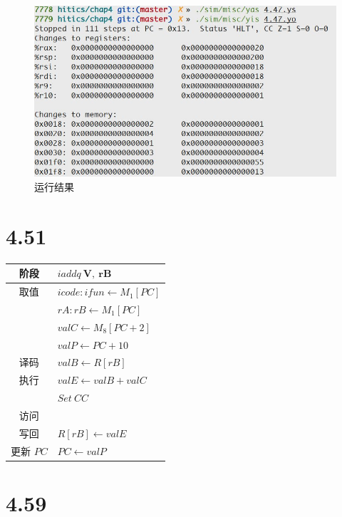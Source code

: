 \documentclass[11pt]{article}
\begin{document}
\begin{figure}[htbp!]
  \includegraphics[width=\linewidth]{figures/4.47.jpg}
  \caption{运行结果}
\end{figure}

\section*{4.51}
\begin{tabular}[htbp!]{|c|l|}
  \hline
  阶段 & $ iaddq\ \mathbf{V,\ rB} $ \\
  \hline
  取值 & $ icode:ifun \leftarrow M_1[PC] $ \\
       & $ rA:rB \leftarrow M_1[PC] $ \\
       & $ valC \leftarrow M_8[PC + 2] $ \\
       & $ valP \leftarrow PC + 10 $ \\
  \hline
  译码 & $ valB \leftarrow R[rB] $ \\
  \hline
  执行 & $ valE \leftarrow valB + valC $ \\
       & $ Set\ CC $ \\
  \hline
  访问 & \\
  \hline
  写回 & $ R[rB] \leftarrow valE $ \\
  \hline
  更新 $ PC $ & $ PC \leftarrow valP $ \\
  \hline
\end{tabular}

\section*{4.59}
\end{document}
